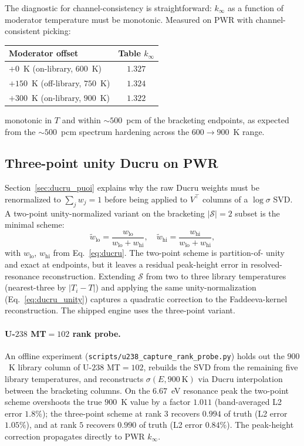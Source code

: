 The diagnostic for channel-consistency is straightforward:
$k_\infty$ as a function of moderator temperature must be
monotonic. Measured on PWR with channel-consistent picking:

\begin{center}
\begin{tabular}{@{}lc@{}}
\toprule
Moderator offset & Table $k_\infty$ \\
\midrule
$+0$~K (on-library, $600$~K)     & $1.327$ \\
$+150$~K (off-library, $750$~K)  & $1.324$ \\
$+300$~K (on-library, $900$~K)   & $1.322$ \\
\bottomrule
\end{tabular}
\end{center}

\noindent monotonic in $T$ and within $\sim\!500$~pcm of
the bracketing endpoints, as expected from the
$\sim\!500$~pcm spectrum hardening across the
$600 \to 900$~K range.

\subsection{Three-point unity Ducru on PWR}
\label{sec:off_library_3t}

Section~\ref{sec:ducru_puoi} explains why the raw Ducru
weights must be renormalized to $\sum_j w_j = 1$ before
being applied to $V^\top$ columns of a $\log\sigma$ SVD.
A two-point unity-normalized variant on the bracketing
$|\mathcal{S}|=2$ subset is the minimal scheme:
\begin{equation}
\tilde w_\text{lo} = \frac{w_\text{lo}}{w_\text{lo}+w_\text{hi}},
\quad
\tilde w_\text{hi} = \frac{w_\text{hi}}{w_\text{lo}+w_\text{hi}},
\end{equation}
with $w_\text{lo}$, $w_\text{hi}$ from
Eq.~\ref{eq:ducru}. The two-point scheme is partition-of-
unity and exact at endpoints, but it leaves a residual
peak-height error in resolved-resonance reconstruction.
Extending $\mathcal{S}$ from two to three library
temperatures (nearest-three by $|T_i - T|$) and applying
the same unity-normalization
(Eq.~\ref{eq:ducru_unity}) captures a quadratic correction
to the Faddeeva-kernel reconstruction. The shipped engine
uses the three-point variant.

\paragraph{U-$238$ MT$=102$ rank probe.}
An offline experiment
(\texttt{scripts/u238\_capture\_rank\_probe.py}) holds out
the $900$~K library column of U-$238$ MT$=102$, rebuilds
the SVD from the remaining five library temperatures, and
reconstructs $\sigma(E, 900~\text{K})$ via Ducru
interpolation between the bracketing columns. On the
$6.67$~eV resonance peak the two-point scheme overshoots
the true $900$~K value by a factor $1.011$ (band-averaged
L2 error $1.8\%$); the three-point scheme at rank $3$
recovers $0.994$ of truth (L2 error $1.05\%$), and at
rank $5$ recovers $0.990$ of truth (L2 error $0.84\%$).
The peak-height correction propagates directly to PWR
$k_\infty$.

